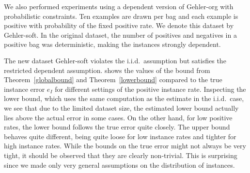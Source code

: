 We also performed experiments using a dependent version of Gehler-org
with probabilistic constraints. Ten examples are drawn per bag and each example is positive with probability
of the fixed positive rate. We denote this dataset by Gehler-soft. In the original dataset, the number of positives and negatives in a positive bag
was deterministic, making the instances strongly dependent.

The new dataset Gehler-soft violates the i.i.d.\ assumption but satisfies the
restricted dependent assumption. 
shows the values of the bound from Theorem~\ref{globalbound} and Theorem~\ref{lowerbound} compared to the
true instance error $e_I$ for different settings of the positive instance rate.
Inspecting the lower bound, which uses the same computation as the estimate in the i.i.d.\ case, we see that due to the limited
dataset size, the estimated lower bound actually lies above the actual error in some cases. On the other hand, for low positive
rates, the lower bound follows the true error quite closely.
The upper bound behaves quite different, being quite loose for low instance rates and tighter for high instance rates.
While the bounds on the true error might not always be very tight, it should be observed that they are clearly
non-trivial. This is surprising since we made only very general assumptions on the distribution of instances.

